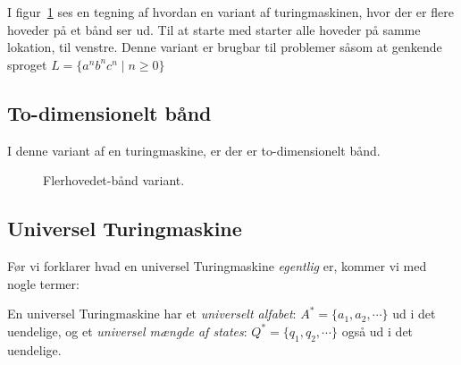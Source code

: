 I figur~\ref{fig:flerehoveder} ses en tegning af hvordan en variant af turingmaskinen, hvor der er flere hoveder på et bånd ser ud. Til at starte med starter alle hoveder på samme lokation, til venstre. Denne variant er brugbar til problemer såsom at genkende sproget $L = \{a^{n}b^{n}c^{n} \mid n \ge 0\}$

\subsection{To-dimensionelt bånd}%
\label{subsec:todimensioneltbånd}

I denne variant af en turingmaskine, er der er to-dimensionelt bånd.

\begin{figure}[ht]
	\centering
	\caption{\label{fig:flerehoveder} Flerhovedet-bånd variant.}
\end{figure}

\subsection{Universel Turingmaskine}%
\label{subsec:universalturingmachine}

Før vi forklarer hvad en universel Turingmaskine \textit{egentlig }er, kommer vi med nogle termer:

En universel Turingmaskine har et \textit{universelt alfabet}: $A^{*} = \{a_{1}, a_{2}, \cdots\}$  ud i det uendelige, og et \textit{universel mængde af states}: $Q^{*} = \{q_{1}, q_{2}, \cdots\}$ også ud i det uendelige.

